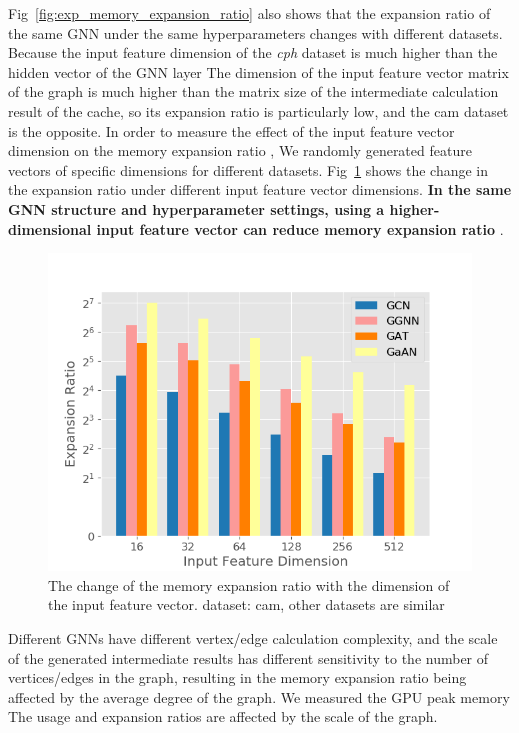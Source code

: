 Fig~\ref{fig:exp_memory_expansion_ratio} also shows that the expansion ratio of the same GNN under the same hyperparameters changes with different datasets.
Because the input feature dimension of the \textit{cph} dataset is much higher than the hidden vector of the GNN layer The dimension of the input feature vector matrix
of the graph is much higher than the matrix size of the intermediate calculation result of the cache, 
so its expansion ratio is particularly low, and the cam dataset is the opposite. In order to measure the effect of the input feature vector dimension on the memory
expansion ratio , We randomly generated feature vectors of specific dimensions for different datasets.
Fig~\ref{fig:exp_memory_expension_ratio_input_feature_dimension} shows the change in the expansion ratio under different input feature vector dimensions.
\textbf{In the same GNN structure and hyperparameter settings, using a higher-dimensional input feature vector can reduce memory expansion ratio} .

\begin{figure}
    \centering
    \includegraphics[width=0.7\columnwidth]{figs/experiments/exp_memory_expansion_ratio_input_feature_dimension_com-amazon.png}
    \caption{The change of the memory expansion ratio with the dimension of the input feature vector. dataset: cam, other datasets are similar}
    \label{fig:exp_memory_expension_ratio_input_feature_dimension}
\end{figure}

Different GNNs have different vertex/edge calculation complexity, and the scale of the generated intermediate results has different sensitivity
to the number of vertices/edges in the graph, resulting in the memory expansion ratio being affected by the average degree of the graph.
We measured the GPU peak memory The usage and expansion ratios are affected by the scale of the graph.

